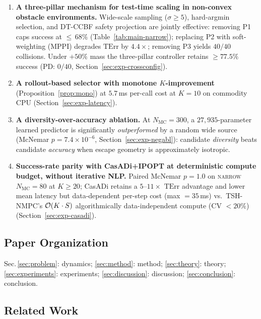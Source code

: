 \documentclass[11pt,onecolumn,a4paper]{article}
\newcommand{\Nm}{N_{\mathrm{MC}}}
\newcommand{\TErr}{\mathrm{TErr}}
\begin{document}
\begin{enumerate}
\item \textbf{A three-pillar mechanism for test-time scaling in
non-convex obstacle environments.} Wide-scale sampling
($\sigma \ge 5$), hard-argmin selection, and DT-CCBF safety projection
are jointly effective: removing P1 caps success at ${\le}\,68\%$
(Table~\ref{tab:main-narrow}); replacing P2 with soft-weighting
(MPPI) degrades $\TErr$ by $4.4\times$; removing P3 yields
$40/40$ collisions. Under $+50\%$ mass the three-pillar controller
retains $\ge 77.5\%$ success (PD: $0/40$, Section~\ref{sec:exp-crossconfig}).

\item \textbf{A rollout-based selector with monotone $K$-improvement}
(Proposition~\ref{prop:mono}) at $5.7\,$ms per-call cost
at $K = 10$ on commodity CPU (Section~\ref{sec:exp-latency}).

\item \textbf{A diversity-over-accuracy ablation.}
At $\Nm = 300$, a $27{,}935$-parameter learned predictor is
significantly \emph{outperformed} by a random wide source
(McNemar $p = 7.4 \times 10^{-6}$, Section~\ref{sec:exp-negabl}):
candidate \emph{diversity} beats candidate \emph{accuracy} when
escape geometry is approximately isotropic.

\item \textbf{Success-rate parity with CasADi+IPOPT at deterministic
compute budget, without iterative NLP.} Paired McNemar $p = 1.0$
on \textsc{narrow} $\Nm = 80$ at $K \ge 20$; CasADi retains a
$5$--$11\times$ $\TErr$ advantage and lower mean latency but
data-dependent per-step cost (max $= 35\,$ms) vs.\ TSH-NMPC's
${\cal O}(K \cdot S)$ algorithmically data-independent compute
(CV $< 20\%$) (Section~\ref{sec:exp-casadi}).
\end{enumerate}

\subsection{Paper Organization}

Sec.\,\ref{sec:problem}: dynamics; \ref{sec:method}: method;
\ref{sec:theory}: theory; \ref{sec:experiments}: experiments;
\ref{sec:discussion}: discussion; \ref{sec:conclusion}: conclusion.

\subsection{Related Work}
\end{document}
